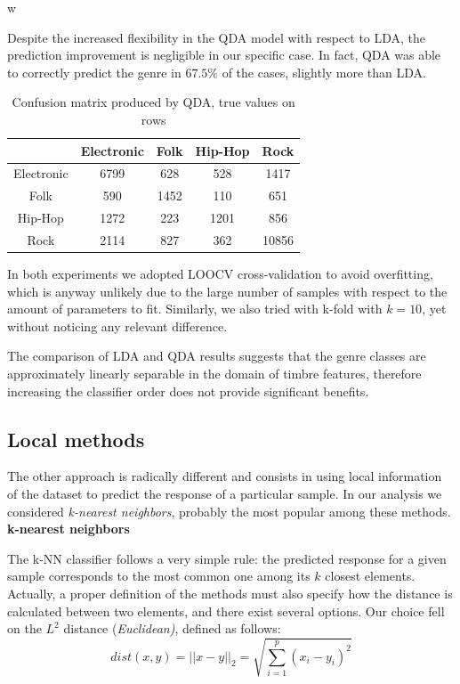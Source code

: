 w\documentclass[11pt, oneside]{article}
\begin{document}
Despite the increased flexibility in the QDA model with respect to LDA, the prediction improvement is negligible in our specific case. 
In fact, QDA was able to correctly predict the genre in $67.5\%$ of the cases, slightly more than LDA.

\begin{table}[h]
\centering
\begin{tabular}{|c|c|c|c|c|}
    \hline
                & Electronic & Folk & Hip-Hop & Rock \\ \hline
    Electronic  &   6799    &  628  &  528  &  1417 \\ \hline
    Folk        &   590     &  1452 &  110  &  651  \\ \hline
    Hip-Hop     &   1272    &  223  &  1201 &  856  \\ \hline
    Rock        &   2114    &  827  &  362  &  10856 \\ \hline
\end{tabular}
\caption{Confusion matrix produced by QDA, true values on rows}
\label{table:qdaconfusion}
\end{table}

In both experiments we adopted LOOCV cross-validation to avoid overfitting, which is anyway unlikely due to the large number of samples with respect to the amount of parameters to fit. Similarly, we also tried with k-fold with $k=10$, yet without noticing any relevant difference.

The comparison of LDA and QDA results suggests that the genre classes are approximately linearly separable in the domain of timbre features, therefore increasing the classifier order does not provide significant benefits.

\subsection{Local methods}

The other approach is radically different and consists in using local information of the dataset to predict the response of a particular sample. In our analysis we considered \emph{k-nearest neighbors}, probably the most popular among these methods.\\

\noindent\textbf{k-nearest neighbors}

The k-NN classifier follows a very simple rule: the predicted response for a given sample corresponds to the most common one among its $k$ closest elements. Actually, a proper definition of the methods must also specify how the distance is calculated between two elements, and there exist several options.
Our choice fell on the $L^2$ distance (\emph{Euclidean)}, defined as follows:
\begin{equation*}
    dist(x, y) = ||x - y||_2 = \sqrt{\sum_{i=1}^p (x_i-y_i)^2}
\end{equation*}
\end{document}
